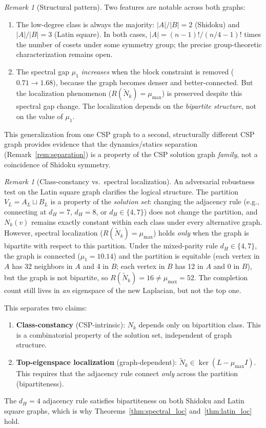 \documentclass[11pt]{article}
\theoremstyle{definition}
\theoremstyle{remark}
\newtheorem{remark}[theorem]{Remark}
\begin{document}
\begin{remark}[Structural pattern]\label{rem:pattern}
Two features are notable across both graphs:
\begin{enumerate}[nosep, label=(\alph*)]
\item The low-degree class is always the majority: $|A|/|B| = 2$ (Shidoku) and $|A|/|B| = 3$ (Latin square). In both cases, $|A| = (n-1)! / (n/4 - 1)!$ times the number of cosets under some symmetry group; the precise group-theoretic characterization remains open.
\item The spectral gap $\mu_1$ \emph{increases} when the block constraint is removed ($0.71 \to 1.68$), because the graph becomes denser and better-connected. But the localization phenomenon ($R(\tilde{N}_k) = \mu_{\max}$) is preserved despite this spectral gap change. The localization depends on the \emph{bipartite structure}, not on the value of $\mu_1$.
\end{enumerate}
\end{remark}

This generalization from one CSP graph to a second, structurally different CSP graph provides evidence that the dynamics/statics separation (Remark~\ref{rem:separation}) is a property of the CSP solution graph \emph{family}, not a coincidence of Shidoku symmetry.

\begin{remark}[Class-constancy vs.\ spectral localization]\label{rem:adversarial}
An adversarial robustness test on the Latin square graph clarifies the logical structure.  The partition $V_L = A_L \sqcup B_L$ is a property of the \emph{solution set}: changing the adjacency rule (e.g., connecting at $d_H = 7$, $d_H = 8$, or $d_H \in \{4,7\}$) does not change the partition, and $N_k(v)$ remains exactly constant within each class under every alternative graph.  However, spectral localization ($R(\tilde{N}_k) = \mu_{\max}$) holds \emph{only} when the graph is bipartite with respect to this partition.  Under the mixed-parity rule $d_H \in \{4,7\}$, the graph is connected ($\mu_1 = 10.14$) and the partition is equitable (each vertex in $A$ has 32 neighbors in $A$ and 4 in $B$; each vertex in $B$ has 12 in $A$ and 0 in $B$), but the graph is not bipartite, so $R(\tilde{N}_k) = 16 \neq \mu_{\max} = 52$.  The completion count still lives in \emph{an} eigenspace of the new Laplacian, but not the top one.

This separates two claims:
\begin{enumerate}[nosep, label=(\roman*)]
\item \textbf{Class-constancy} (CSP-intrinsic): $N_k$ depends only on bipartition class.  This is a combinatorial property of the solution set, independent of graph structure.
\item \textbf{Top-eigenspace localization} (graph-dependent): $\tilde{N}_k \in \ker(L - \mu_{\max} I)$.  This requires that the adjacency rule connect \emph{only} across the partition (bipartiteness).
\end{enumerate}
The $d_H = 4$ adjacency rule satisfies bipartiteness on both Shidoku and Latin square graphs, which is why Theorems~\ref{thm:spectral_loc} and~\ref{thm:latin_loc} hold.
\end{remark}
\end{document}
